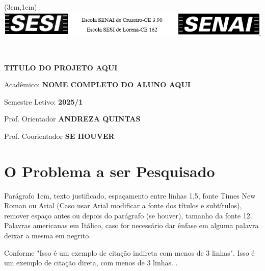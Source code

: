 % 


\thispagestyle{empty}

\begin{center}
    \textblockorigin{-18pt}{-2pt}
    \begin{textblock*}{10cm}(3cm,1cm)
    \centering
    \includegraphics[width=16cm]{Logo SESI-SENAI 2.png}
    \end{textblock*} ~\\[2em]
\end{center}

\begin{center}
{\bf \large \MakeUppercase{Titulo do Projeto Aqui}}\\[2em]
\end{center}


Acadêmico: \textbf{\MakeUppercase{Nome Completo do Aluno Aqui}} 

Semestre Letivo: \textbf{2025/1} 

Prof. Orientador \textbf{\MakeUppercase{Andreza Quintas}} 

Prof. Coorientador \textbf{\MakeUppercase{Se Houver}} 
\justify \linespread{1.5}


\section{O Problema a ser Pesquisado}

Parágrafo 1cm, texto justificado, espaçamento entre linhas 1,5, fonte Times New Roman ou Arial (Caso usar Arial modificar a fonte dos títulos e subtítulos), remover espaço antes ou depois do parágrafo (se houver), tamanho da fonte 12. Palavras americanas em Itálico, caso for necessário dar ênfase em alguma palavra deixar a mesma em negrito. 

Conforme  "Isso é um exemplo de citação indireta com menos de 3 linhas".
Isso é um exemplo de citação direta, com menos de 3 linhas. \cite{citacao2}.

